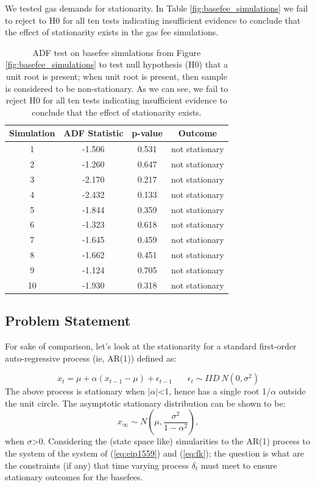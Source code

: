 \documentclass{article}
\begin{document}
We tested gas demands for stationarity. In Table \ref{fig:basefee_simulations} we fail to reject to H0 for all ten tests indicating insufficient evidence to conclude that the effect of stationarity exists in the gas fee simulations. 

\begin{table}
\centering
\begin{tabular}{ |c|c|c|c| } 
\hline
 Simulation & ADF Statistic & p-value & Outcome \\
\hline
1 & -1.506 & 0.531 & not stationary \\
2 & -1.260 & 0.647 & not stationary \\
3 & -2.170 & 0.217 & not stationary \\
4 & -2.432 & 0.133 & not stationary \\
5 & -1.844 & 0.359 & not stationary \\
6 & -1.323 & 0.618 & not stationary \\
7 & -1.645 & 0.459 & not stationary \\
8 & -1.662 & 0.451 & not stationary \\
9 & -1.124 & 0.705 & not stationary \\
10 & -1.930 & 0.318 & not stationary \\
\hline
\end{tabular}
\caption{ADF test on basefee simulations from Figure \ref{fig:basefee_simulations} to test null hypothesis (H0) that a unit root is present; when unit root is present, then sample is considered to be non-stationary. As we can see, we fail to reject H0 for all ten tests indicating insufficient evidence to conclude that the effect of stationarity exists.}
\label{table:pow_vs_pos}
\end{table}

\subsection{Problem Statement}
\label{section:problem_statement}
For sake of comparison, let's look at the stationarity for a standard first-order auto-regressive process  (ie, AR(1)) defined as:

\begin{equation}
x_{t} = \mu + \alpha (x_{t-1} -\mu) + \epsilon_{t-1} ~~~~~~~~ \epsilon_{t} \sim IID~N(0,\sigma^2)
\label{eq:ar1} 
\end{equation}
The above process is stationary when $|\alpha|$<1, hence has a single root 1/$\alpha$ outside the unit circle. The asymptotic stationary distribution can be shown to be:
\begin{equation}
x_{\infty} \sim N(\mu,\frac{\sigma^2}{1-\alpha^2}),
\label{eq:x_infinity} 
\end{equation}
when $\sigma$>0. Considering the (state space like) simularities to the AR(1) process to the system of the system of (\ref{eq:eip1559}) and (\ref{eq:fk}); the question is what are the constraints (if any) that time varying process $\delta_{t}$ must meet to ensure stationary outcomes for the basefees.
\end{document}
